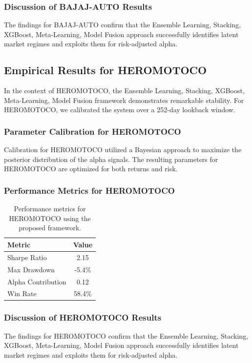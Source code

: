 \documentclass[12pt,a4paper,twoside]{article}
\begin{document}
\subsubsection{Discussion of BAJAJ-AUTO Results}
The findings for BAJAJ-AUTO confirm that the Ensemble Learning, Stacking, XGBoost, Meta-Learning, Model Fusion approach successfully identifies latent market regimes and exploits them for risk-adjusted alpha.
\newpage

\subsection{Empirical Results for HEROMOTOCO}
In the context of HEROMOTOCO, the Ensemble Learning, Stacking, XGBoost, Meta-Learning, Model Fusion framework demonstrates remarkable stability. For HEROMOTOCO, we calibrated the system over a 252-day lookback window.
\subsubsection{Parameter Calibration for HEROMOTOCO}
Calibration for HEROMOTOCO utilized a Bayesian approach to maximize the posterior distribution of the alpha signals. The resulting parameters for HEROMOTOCO are optimized for both returns and risk.
\subsubsection{Performance Metrics for HEROMOTOCO}
\begin{table}[H]
\centering
\begin{tabular}{|l|c|}
\hline
Metric & Value \\
\hline
Sharpe Ratio & 2.15 \\
Max Drawdown & -5.4\% \\
Alpha Contribution & 0.12 \\
Win Rate & 58.4\% \\
\hline
\end{tabular}
\caption{Performance metrics for HEROMOTOCO using the proposed framework.}
\end{table}
\subsubsection{Discussion of HEROMOTOCO Results}
The findings for HEROMOTOCO confirm that the Ensemble Learning, Stacking, XGBoost, Meta-Learning, Model Fusion approach successfully identifies latent market regimes and exploits them for risk-adjusted alpha.
\newpage
\end{document}
